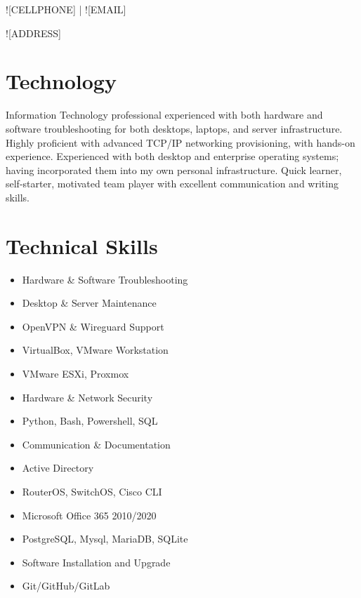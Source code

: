\documentclass[a4paper]{article}
\renewcommand{\maketitle}{
    \begin{center}
        \color{white}
        {\huge\bfseries\theauthor}
        \vspace{.5em}

        \textsf{![CELLPHONE] | ![EMAIL]}\par
        \textsf{![ADDRESS]}

    \end{center}
}
\begin{document}
%

\author{\textsf{![FIRSTNAME] ![LASTNAME]}}
\maketitle

\section{Technology}

Information Technology professional experienced with both hardware and software troubleshooting for both desktops, laptops, and server infrastructure. Highly proficient with advanced TCP/IP networking provisioning, with hands-on experience. Experienced with both desktop and enterprise operating systems; having incorporated them into my own personal infrastructure. Quick learner, self-starter, motivated team player with excellent communication and writing skills.

\section{Technical Skills}

\begin{multicols}{2}
    \begin{itemize}
        \item Hardware \& Software Troubleshooting
        \item Desktop \& Server Maintenance
        \item OpenVPN \& Wireguard Support
        \item VirtualBox, VMware Workstation
        \item VMware ESXi, Proxmox
        \item Hardware \& Network Security
        \item Python, Bash, Powershell, SQL
        \item Communication \& Documentation
        \item Active Directory
        \item RouterOS, SwitchOS, Cisco CLI
        \item Microsoft Office 365 2010/2020
        \item PostgreSQL, Mysql, MariaDB, SQLite
        \item Software Installation and Upgrade
        \item Git/GitHub/GitLab

    \end{itemize}
\end{multicols}
\end{document}
